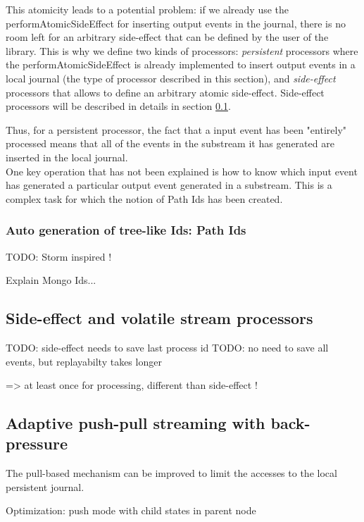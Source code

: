 This atomicity leads to a potential problem: if we already use the performAtomicSideEffect for inserting output events in the journal, there is no room left for an arbitrary side-effect that can be defined by the user of the library. This is why we define two kinds of processors: \textit{persistent} processors where the performAtomicSideEffect is already implemented to insert output events in a local journal (the type of processor described in this section), and \textit{side-effect} processors that allows to define
an arbitrary atomic side-effect. Side-effect processors will be described in details in section \ref{sec:sideeffectproc}.

Thus, for a persistent processor, the fact that a input event has been "entirely" processed means that all of the events in the substream it has generated are inserted in the local journal.
\\

One key operation that has not been explained is how to know which input event has generated a particular output event generated in a substream. This is a complex task for which the notion of Path Ids has been created.

\subsubsection{Auto generation of tree-like Ids: Path Ids}



TODO: Storm inspired !

Explain Mongo Ids...

\subsection{Side-effect and volatile stream processors}
\label{sec:sideeffectproc}

TODO: side-effect needs to save last process id
TODO: no need to save all events, but replayabilty takes longer

=> at least once for processing, different than side-effect !


\subsection{Adaptive push-pull streaming with back-pressure}

The pull-based mechanism can be improved to limit the accesses to the local persistent journal.


Optimization: push mode with child states in parent node

